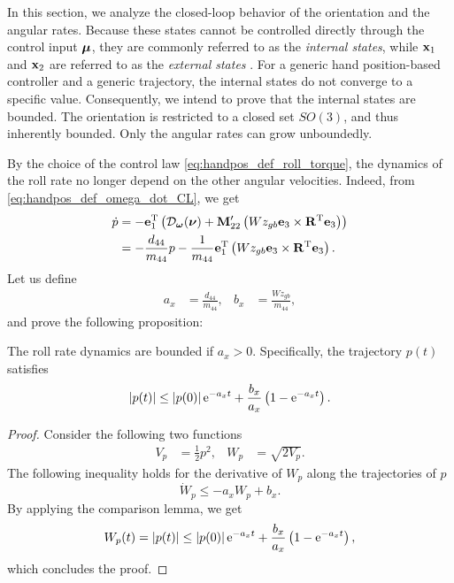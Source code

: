 In this section, we analyze the closed-loop behavior of the orientation and the angular rates.
Because these states cannot be controlled directly through the control input $\bm{\mu}$, they are commonly referred to as the \emph{internal states}, while $\mathbf{x}_1$ and $\mathbf{x}_2$ are referred to as the \emph{external states} \cite{paliotta_trajectory_2019}.
For a generic hand position-based controller and a generic trajectory, the internal states do not converge to a specific value.
Consequently, we intend to prove that the internal states are bounded.
The orientation is restricted to a closed set $SO(3)$, and thus inherently bounded.
Only the angular rates can grow unboundedly.

By the choice of the control law \eqref{eq:handpos_def_roll_torque}, the dynamics of the roll rate no longer depend on the other angular velocities.
Indeed, from \eqref{eq:handpos_def_omega_dot_CL}, we get
\begin{equation}
    \begin{split}
        \dot{p} &= - \mathbf{e}_1^{\mathrm{T}} \left(\mathcal{D}_{\bm{\omega}}(\bm{\nu}) + \mathbf{M}_{22}^{\prime}\left(Wz_{gb} \mathbf{e}_3 \times \mathbf{R}^{\mathrm{T}} \mathbf{e}_3\right)\right) \\
            &= - \frac{d_{44}}{m_{44}} p - \frac{1}{m_{44}} \mathbf{e}_1^{\mathrm{T}} \left(Wz_{gb} \mathbf{e}_3 \times \mathbf{R}^{\mathrm{T}} \mathbf{e}_3\right).
    \end{split}
\end{equation}
Let us define
\begin{align}
    a_x &= \frac{d_{44}}{m_{44}}, &
    b_x &= \frac{Wz_{gb}}{m_{44}},
    \label{eq:handpos_def_a_x_b_x}
\end{align}
and prove the following proposition:

\begin{lemma}
    \label{lemma:handpos_def_roll_rate}
    The roll rate dynamics are bounded if $a_x > 0$.
    Specifically, the trajectory $p(t)$ satisfies
    \begin{equation}
        \left|p(t)\right| \leq \left|p(0)\right|{\rm e}^{-a_xt} + \frac{b_x}{a_x}\left(1 - {\rm e}^{-a_xt}\right).
    \end{equation}
\end{lemma}
\begin{proof}
    Consider the following two functions
    \begin{align}
        V_{p} &= \frac{1}{2} p^2, &
        W_{p} &= \sqrt{2 V_{p}}.
    \end{align}
    The following inequality holds for the derivative of $W_p$ along the trajectories of $p$
    \begin{equation}
        \dot{W}_p \leq -a_xW_p + b_x.
    \end{equation}
    By applying the comparison lemma, we get
    \begin{equation}
        W_p(t) = \left|p(t)\right| \leq \left|p(0)\right|{\rm e}^{-a_xt} + \frac{b_x}{a_x}\left(1 - {\rm e}^{-a_xt}\right),
    \end{equation}
    which concludes the proof.
\end{proof}


